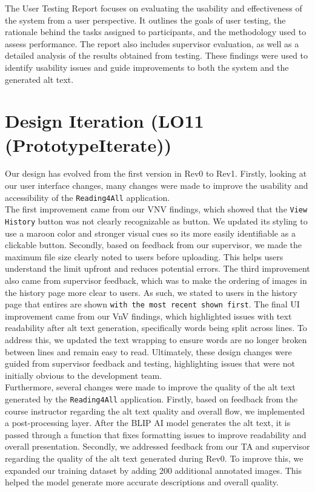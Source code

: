 \documentclass{article}
\begin{document}
The User Testing Report focuses on evaluating the usability and effectiveness of the system from a user 
perspective. It outlines the goals of user testing, the rationale behind the tasks assigned to 
participants, and the methodology used to assess performance. The report also includes supervisor 
evaluation, as well as a detailed analysis of the results obtained from testing. These findings were 
used to identify usability issues and guide improvements to both the system and the generated alt text.

\section{Design Iteration (LO11 (PrototypeIterate))} 

Our design has evolved from the first version in Rev0 to Rev1. Firstly, looking at our user interface changes, 
many changes were made to improve the usability and accessibility of the \texttt{Reading4All} application. \\

The first improvement came from our VNV findings, which showed that the \texttt{View History} button was not clearly recognizable as button.
We updated its styling to use a maroon color and stronger visual cues so its more easily identifiable as a clickable button.
Secondly, based on feedback from our supervisor, we made the maximum file size clearly noted to users before uploading. 
This helps users understand the limit upfront and reduces potential errors.
The third improvement also came from supervisor feedback, which was to make the ordering of images in the history page more clear to users. As such, we stated to 
users in the history page that entires are shown \texttt{with the most recent shown first}. 
The final UI improvement came from our VnV findings, which highlighted issues with text readability after alt text generation, 
specifically words being split across lines. To address this, we updated the text wrapping  to ensure words are no longer broken between lines and remain easy to read.
Ultimately, these design changes were guided from supervisor feedback and testing, highlighting issues that were not initially obvious to the development team.\\

Furthermore, several changes were made to improve the quality of the alt text generated by the \texttt{Reading4All} application. 
Firstly, based on feedback from the course instructor regarding the alt text quality and overall flow, we implemented a post-processing layer. 
After the BLIP AI model generates the alt text, it is passed through a function that fixes formatting issues to improve readability and overall presentation.
Secondly, we addressed feedback from our TA and supervisor regarding the quality of the alt text generated during Rev0. 
To improve this, we expanded our training dataset by adding 200 additional annotated images. 
This helped the model generate more accurate descriptions and overall quality.\\
\end{document}
